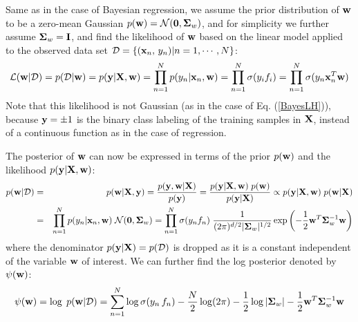 \documentclass{article}
\begin{document}
Same as in the case of Bayesian regression, we assume the prior 
distribution of ${\bf w}$ to be a zero-mean Gaussian 
$p({\bf w})={\cal N}({\bf 0},{\bf\Sigma}_w)$, and for simplicity
we further assume ${\bf\Sigma}_w={\bf I}$, and find the likelihood of
${\bf w}$ based on the linear model applied to the observed data set
${\cal D}=\{({\bf x}_n,\,y_n)|n=1,\cdots,N\}$:
\begin{equation}
  {\cal L}({\bf w}|{\cal D})=p({\cal D}|{\bf w})
  =p({\bf y}|{\bf X},{\bf w})=\prod_{n=1}^N p(y_n|{\bf x}_n,{\bf w})
  =\prod_{n=1}^N \sigma(y_if_i)=\prod_{n=1}^N \sigma(y_n{\bf x}_n^T{\bf w})
\end{equation}
Note that this likelihood is not Gaussian (as in the case of 
Eq. (\ref{BayesLH})), because ${\bf y}=\pm 1$ is the binary class 
labeling of the training samples in ${\bf X}$, instead of a continuous 
function as in the case of regression.

The posterior of ${\bf w}$ can now be expressed in terms of the 
prior $p({\bf w})$ and the likelihood $p({\bf y}|{\bf X},{\bf w})$:
\begin{eqnarray}
  p({\bf w}|{\cal D})&=&p({\bf w}|{\bf X},{\bf y})
  =\frac{p({\bf y},{\bf w}|{\bf X})}{p({\bf y})}
  =\frac{p({\bf y}|{\bf X},{\bf w})\; p({\bf w})}{p({\bf y}|{\bf X})}
  \propto p({\bf y}|{\bf X},{\bf w})\;p({\bf w}|{\bf X})
  \nonumber\\
  &=&\prod_{n=1}^Np(y_n|{\bf x}_n,{\bf w})\;{\cal N}({\bf 0},{\bf\Sigma}_w) 
  =\prod_{n=1}^N\sigma(y_nf_n)\;
  \frac{1}{(2\pi)^{d/2}|{\bf\Sigma}_w|^{1/2}}
  \exp\left(-\frac{1}{2}{\bf w}^T{\bf\Sigma}_w^{-1}{\bf w}\right)
  \label{PosteriorGaussianLinear}
\end{eqnarray}
where the denominator $p({\bf y}|{\bf X})=p({\cal D})$ is dropped as 
it is a constant independent of the variable ${\bf w}$ of interest. 
We can further find the log posterior denoted by $\psi({\bf w})$:
\begin{equation}
  \psi({\bf w})=\log \;p({\bf w}|{\cal D})
  =\sum_{n=1}^N \log \sigma(y_n\,f_n)
  -\frac{N}{2}\log(2\pi)-\frac{1}{2}\log|{\bf\Sigma}_w|
  -\frac{1}{2}{\bf w}^T{\bf\Sigma}_w^{-1}{\bf w}
  \label{PsiLogPL}
\end{equation}

\end{document}
